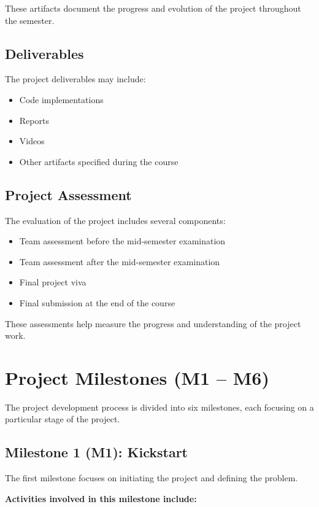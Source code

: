 \documentclass[12pt,a4paper]{article}
\begin{document}
These artifacts document the progress and evolution of the project throughout the semester.

\subsection{Deliverables}

The project deliverables may include:

\begin{itemize}
\item Code implementations
\item Reports
\item Videos
\item Other artifacts specified during the course
\end{itemize}

\subsection{Project Assessment}

The evaluation of the project includes several components:

\begin{itemize}
\item Team assessment before the mid-semester examination
\item Team assessment after the mid-semester examination
\item Final project viva
\item Final submission at the end of the course
\end{itemize}

These assessments help measure the progress and understanding of the project work.

\section{Project Milestones (M1 – M6)}

The project development process is divided into six milestones, each focusing on a particular stage of the project.

\subsection{Milestone 1 (M1): Kickstart}

The first milestone focuses on initiating the project and defining the problem.

\textbf{Activities involved in this milestone include:}
\end{document}
